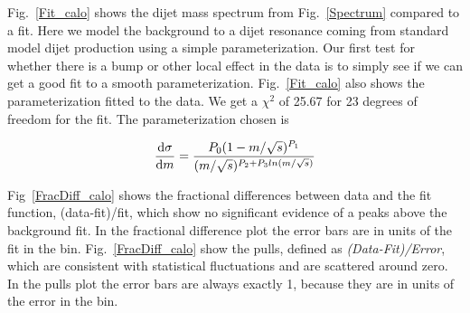 Fig.~\ref{Fit_calo} shows the dijet mass spectrum from Fig.~\ref{Spectrum}
compared to a fit. Here we model the background to a dijet resonance
coming from standard model dijet production using a simple
parameterization. Our first test for whether there is a bump or other
local effect in the data is to simply see if we can get a good fit to
a smooth parameterization.  Fig.~\ref{Fit_calo} also shows the
parameterization fitted to the data. We get a $\chi^2$ of 25.67 for 23
degrees of freedom for the fit.  The parameterization chosen
is~\cite{Aaltonen:2008dn,ATLAS_Search}


\begin{equation}
\frac{{\rm d}\sigma}{{\rm d}m} = 
\frac{P_{0} (1 - m/\sqrt{s})^{P_{1}}}{(m/\sqrt{s})^{P_{2} + P_{3} ln
(m/\sqrt{s})}}
\label{eqParam}
\end{equation}

Fig~\ref{FracDiff_calo} shows the fractional differences between data and
the fit function, (data-fit)/fit, which show no significant evidence
of a peaks above the background fit. 
In the
fractional difference plot the error bars are in units of the fit in
the bin.  Fig.~\ref{FracDiff_calo} show the pulls, defined as \textit
{(Data-Fit)/Error}, which are consistent with statistical fluctuations
and are scattered around zero. In the pulls plot the error bars are
always exactly 1, because they are in units of the error in the bin.

